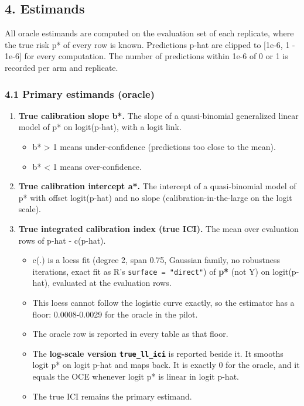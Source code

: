 \documentclass[
  10pt,
]{article}
\providecommand{\tightlist}{%
  \setlength{\itemsep}{0pt}\setlength{\parskip}{0pt}}
\begin{document}
\subsection{4. Estimands}\label{estimands}

All oracle estimands are computed on the evaluation set of
each replicate, where the true risk p* of every row is
known. Predictions p-hat are clipped to {[}1e-6, 1 - 1e-6{]}
for every computation. The number of predictions within 1e-6
of 0 or 1 is recorded per arm and replicate.

\subsubsection{4.1 Primary estimands
(oracle)}\label{primary-estimands-oracle}

\begin{enumerate}
\def\labelenumi{\arabic{enumi}.}
\tightlist
\item
  \textbf{True calibration slope b*.} The slope of a
  quasi-binomial generalized linear model of p* on
  logit(p-hat), with a logit link.

  \begin{itemize}
  \tightlist
  \item
    b* \textgreater{} 1 means under-confidence (predictions
    too close to the mean).
  \item
    b* \textless{} 1 means over-confidence.
  \end{itemize}
\item
  \textbf{True calibration intercept a*.} The intercept of a
  quasi-binomial model of p* with offset logit(p-hat) and no
  slope (calibration-in-the-large on the logit scale).
\item
  \textbf{True integrated calibration index (true ICI).} The
  mean over evaluation rows of \textbar p-hat -
  c(p-hat)\textbar.

  \begin{itemize}
  \tightlist
  \item
    c(.) is a loess fit (degree 2, span 0.75, Gaussian
    family, no robustness iterations, exact fit as R's
    \texttt{surface\ =\ "direct"}) of \textbf{p*} (not Y) on
    logit(p-hat), evaluated at the evaluation rows.
  \item
    This loess cannot follow the logistic curve exactly, so
    the estimator has a floor: 0.0008-0.0029 for the oracle
    in the pilot.
  \item
    The oracle row is reported in every table as that floor.
  \item
    The \textbf{log-scale version \texttt{true\_ll\_ici}} is
    reported beside it. It smooths logit p* on logit p-hat
    and maps back. It is exactly 0 for the oracle, and it
    equals the OCE whenever logit p* is linear in logit
    p-hat.
  \item
    The true ICI remains the primary estimand.
  \end{itemize}
\end{enumerate}
\end{document}
